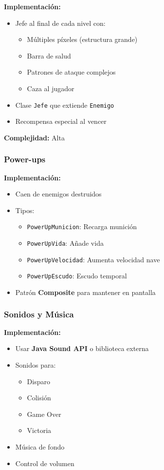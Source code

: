\documentclass[12pt, a4paper]{article}
\begin{document}
\textbf{Implementación:}
\begin{itemize}[leftmargin=2em]
    \item Jefe al final de cada nivel con:
        \begin{itemize}[leftmargin=1.5em]
            \item Múltiples píxeles (estructura grande)
            \item Barra de salud
            \item Patrones de ataque complejos
            \item Caza al jugador
        \end{itemize}
    \item Clase \texttt{Jefe} que extiende \texttt{Enemigo}
    \item Recompensa especial al vencer
\end{itemize}

\textbf{Complejidad:} Alta

\subsubsection{Power-ups}

\textbf{Implementación:}
\begin{itemize}[leftmargin=2em]
    \item Caen de enemigos destruidos
    \item Tipos:
        \begin{itemize}[leftmargin=1.5em]
            \item \texttt{PowerUpMunicion}: Recarga munición
            \item \texttt{PowerUpVida}: Añade vida
            \item \texttt{PowerUpVelocidad}: Aumenta velocidad nave
            \item \texttt{PowerUpEscudo}: Escudo temporal
        \end{itemize}
    \item Patrón \textbf{Composite} para mantener en pantalla
\end{itemize}

\subsubsection{Sonidos y Música}

\textbf{Implementación:}
\begin{itemize}[leftmargin=2em]
    \item Usar \textbf{Java Sound API} o biblioteca externa
    \item Sonidos para:
        \begin{itemize}[leftmargin=1.5em]
            \item Disparo
            \item Colisión
            \item Game Over
            \item Victoria
        \end{itemize}
    \item Música de fondo
    \item Control de volumen
\end{itemize}
\end{document}
